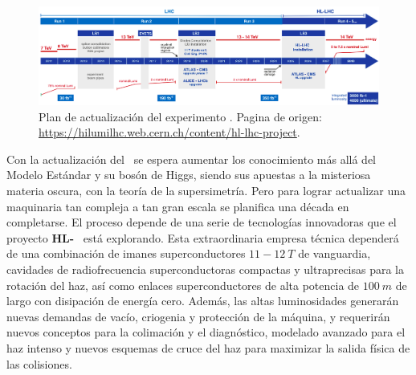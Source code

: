 \begin{figure}[h!]
\centering
\includegraphics[width=1\textwidth]{Analisis_y_Resultados/imagenes/CMS_upgrade.png}
\caption{Plan de actualización del experimento \LHC. Pagina de origen: \url{https://hilumilhc.web.cern.ch/content/hl-lhc-project}.}
\label{cms_actualiza}
\end{figure}

Con la actualización del \LHC ~se espera aumentar los conocimiento más allá del Modelo Estándar y su bosón de Higgs, siendo sus apuestas a la misteriosa materia oscura, con la teoría de la supersimetría. Pero para lograr actualizar una maquinaria tan compleja a tan gran escala se planifica una década en completarse. El proceso depende de una serie de tecnologías innovadoras que el proyecto \textbf{HL-}\LHC ~ está explorando. Esta extraordinaria empresa técnica dependerá de una combinación de imanes superconductores $11-12~T$ de vanguardia, cavidades de radiofrecuencia superconductoras compactas y ultraprecisas para la rotación del haz, así como enlaces superconductores de alta potencia de $100 ~m$ de largo con disipación de energía cero. Además, las altas luminosidades generarán nuevas demandas de vacío, criogenia y protección de la máquina, y requerirán nuevos conceptos para la colimación y el diagnóstico, modelado avanzado para el haz intenso y nuevos esquemas de cruce del haz para maximizar la salida física de las colisiones.



